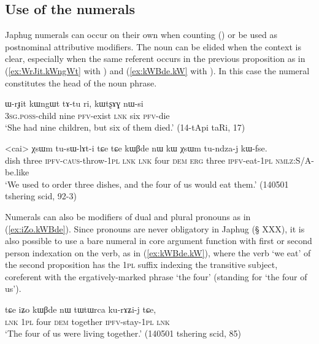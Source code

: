  \subsection{Use of the numerals}  \label{sec:uses.numerals}
 Japhug numerals can occur on their own when counting () or be used as postnominal attributive modifiers. The noun can be elided when the context is clear, especially when the same referent occurs in the previous proposition as in (\ref{ex:WrJit.kWngWt}  with ) and (\ref{ex:kWBde.kW} with ). In this case the numeral constitutes the head of the noun phrase.

\begin{exe}
\ex \label{ex:WrJit.kWngWt} 
\gll
ɯ-rɟit kɯngɯt tɤ-tu ri, kɯtʂɤɣ nɯ-si \\
\textsc{3sg.poss}-child nine \textsc{pfv}-exist \textsc{lnk} six \textsc{pfv}-die \\
\glt `She had nine children, but six of them died.' (14-tApi taRi, 17)
\end{exe}

\begin{exe}
\ex \label{ex:kWBde.kW} 
\gll <cai> χsɯm tu-sɯ-lɤt-i tɕe tɕe  kɯβde nɯ kɯ χsɯm tu-ndza-j kɯ-fse. \\
dish three \textsc{ipfv}-\textsc{caus}-throw-\textsc{1pl} \textsc{lnk} \textsc{lnk} four \textsc{dem} \textsc{erg} three \textsc{ipfv}-eat-\textsc{1pl} \textsc{nmlz}:S/A-be.like \\
\glt `We used to order three dishes, and the four of us would eat them.' (140501 tshering scid, 92-3)
\end{exe}		

Numerals can also be modifiers of dual and plural pronouns as in (\ref{ex:iZo.kWBde}). Since pronouns are never obligatory in Japhug (§ XXX), it is also possible to use a bare numeral in core argument function with first or second person indexation on the verb, as in (\ref{ex:kWBde.kW}), where the verb  `we eat' of the second proposition has the \textsc{1pl}  suffix indexing the transitive subject, coreferent with the ergatively-marked phrase  `the four' (standing for  `the four of us').

\begin{exe}
\ex \label{ex:iZo.kWBde} 
\gll tɕe iʑo kɯβde nɯ tɯtɯrca ku-rɤʑi-j tɕe, \\
\textsc{lnk} \textsc{1pl} four \textsc{dem}  together \textsc{ipfv}-stay-\textsc{1pl} \textsc{lnk} \\
\glt `The four of us were living together.' (140501  tshering scid, 85)
\end{exe}		

